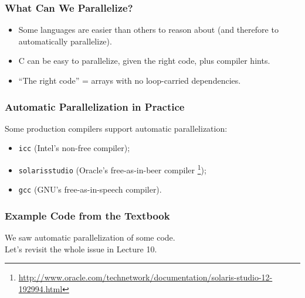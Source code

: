 \documentclass[aspectratio=43]{beamer}
\newenvironment{changemargin}[1]{%
  \begin{list}{}{%
    \setlength{\topsep}{0pt}%
    \setlength{\leftmargin}{#1}%
    \setlength{\rightmargin}{1em}
    \setlength{\listparindent}{\parindent}%
    \setlength{\itemindent}{\parindent}%
    \setlength{\parsep}{\parskip}%
  }%
  \item[]}{\end{list}}
\begin{document}
\begin{frame}
  \frametitle{What Can We Parallelize?}

  \begin{changemargin}{2.5cm}
  
  \begin{itemize}
    \item Some languages are easier than others to reason about (and therefore to
      automatically parallelize).
    \item C can be easy to parallelize, given the right code, plus compiler hints.
    \item ``The right code'' = arrays with no loop-carried dependencies.
  \end{itemize}
  \end{changemargin}
\end{frame}

\begin{frame}
  \frametitle{Automatic Parallelization in Practice}
  \begin{changemargin}{2cm}
    Some production compilers support automatic parallelization: 
    \begin{itemize}
      \item {\tt icc} (Intel's
      non-free compiler);
      \item {\tt solarisstudio} (Oracle's free-as-in-beer
      compiler \footnote{\tiny \url{http://www.oracle.com/technetwork/documentation/solaris-studio-12-192994.html}});
      \item {\tt gcc} (GNU's free-as-in-speech compiler).
    \end{itemize}
  \end{changemargin}

\end{frame}

\begin{frame}[fragile]
  \frametitle{Example Code from the Textbook}

  \begin{changemargin}{1.5cm}
    We saw automatic parallelization of some code.\\
    Let's revisit the whole issue in Lecture 10.
  \end{changemargin}
  
\end{frame}
\end{document}
